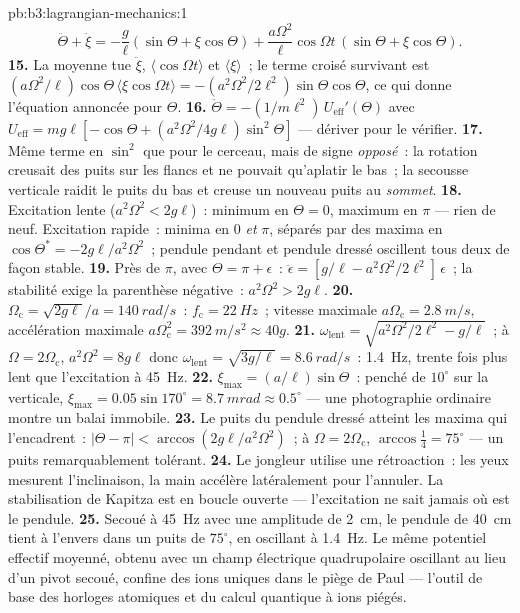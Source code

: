 \begin{solution}{pb:b3:lagrangian-mechanics:1}
\[
\ddot\Theta + \ddot\xi = -\frac{g}{\ell}(\sin\Theta + \xi\cos\Theta)
 + \frac{a\Omega^2}{\ell}\cos\Omega t\,(\sin\Theta + \xi\cos\Theta) .
\]
\textbf{15.} La moyenne tue $\ddot\xi$, $\langle\cos\Omega t\rangle$
et $\langle\xi\rangle$~; le terme croisé survivant est
$(a\Omega^2/\ell)\cos\Theta\,\langle\xi\cos\Omega t\rangle =
-(a^2\Omega^2/2\ell^2)\sin\Theta\cos\Theta$, ce qui donne l'équation
annoncée pour $\Theta$.
\textbf{16.} $\ddot\Theta = -(1/m\ell^2)\,U_{\text{eff}}'(\Theta)$ avec
$U_{\text{eff}} = mg\ell[-\cos\Theta + (a^2\Omega^2/4g\ell)
\sin^2\Theta]$ --- dériver pour le vérifier.
\textbf{17.} Même terme en $\sin^2$ que pour le cerceau, mais de signe
\emph{opposé}~: la rotation creusait des puits sur les flancs et ne
pouvait qu'aplatir le bas~; la secousse verticale raidit le puits du bas
et creuse un nouveau puits au \emph{sommet}.
\textbf{18.} Excitation lente ($a^2\Omega^2 < 2g\ell$)~: minimum en $\Theta =
0$, maximum en $\pi$ --- rien de neuf. Excitation rapide~: minima en $0$
\emph{et} $\pi$, séparés par des maxima en $\cos\Theta^* =
-2g\ell/a^2\Omega^2$~; pendule pendant et pendule dressé oscillent tous
deux de façon stable.
\textbf{19.} Près de $\pi$, avec $\Theta = \pi + \epsilon$~:
$\ddot\epsilon = [g/\ell - a^2\Omega^2/2\ell^2]\,\epsilon$~; la stabilité
exige la parenthèse négative~: $a^2\Omega^2 > 2g\ell$.
\textbf{20.} $\Omega_{\text{c}} = \sqrt{2g\ell}/a = \qty{140}{rad/s}$~:
$f_{\text{c}} = \qty{22}{Hz}$~; vitesse maximale $a\Omega_{\text{c}} =
\qty{2.8}{m/s}$, accélération maximale $a\Omega_{\text{c}}^2 =
\qty{392}{m/s^2} \approx 40g$.
\textbf{21.} $\omega_{\text{lent}} = \sqrt{a^2\Omega^2/2\ell^2 -
g/\ell}$~; à $\Omega = 2\Omega_{\text{c}}$, $a^2\Omega^2 = 8g\ell$ donc
$\omega_{\text{lent}} = \sqrt{3g/\ell} = \qty{8.6}{rad/s}$~:
\qty{1.4}{Hz}, trente fois plus lent que l'excitation à \qty{45}{Hz}.
\textbf{22.} $\xi_{\max} = (a/\ell)\sin\Theta$~: penché de $10^\circ$ sur
la verticale, $\xi_{\max} = 0.05\sin170^\circ = \qty{8.7}{mrad}
\approx 0.5^\circ$ --- une photographie ordinaire montre un balai
immobile.
\textbf{23.} Le puits du pendule dressé atteint les maxima qui l'encadrent~:
$|\Theta - \pi| < \arccos(2g\ell/a^2\Omega^2)$~; à $\Omega =
2\Omega_{\text{c}}$, $\arccos\tfrac14 = 75^\circ$ --- un puits
remarquablement tolérant.
\textbf{24.} Le jongleur utilise une rétroaction~: les yeux mesurent
l'inclinaison, la main accélère latéralement pour l'annuler. La
stabilisation de Kapitza est en boucle ouverte --- l'excitation ne sait
jamais où est le pendule.
\textbf{25.} Secoué à \qty{45}{Hz} avec une amplitude de \qty{2}{cm}, le
pendule de \qty{40}{cm} tient à l'envers dans un puits de $75^\circ$, en
oscillant à \qty{1.4}{Hz}. Le même potentiel effectif moyenné, obtenu
avec un champ électrique quadrupolaire oscillant au lieu d'un pivot
secoué, confine des ions uniques dans le piège de Paul --- l'outil de
base des horloges atomiques et du calcul quantique à ions piégés.
\end{solution}
